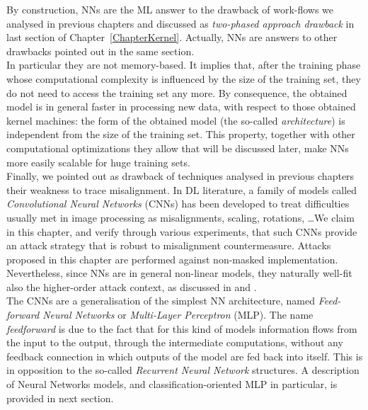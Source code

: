 By construction, NNs are the ML answer to the drawback of work-flows we analysed in previous chapters and discussed as \emph{two-phased approach drawback} in last section of Chapter~\ref{ChapterKernel}. Actually, NNs are answers to other drawbacks pointed out in the same section. \\
In particular they are not memory-based. It implies that, after the training phase whose computational complexity is influenced by the size of the training set, they do not need to access the training set any more. By consequence, the obtained model is in general faster in processing new data, with respect to those obtained \via kernel machines: the form of the obtained model (\ie the so-called \emph{architecture}) is independent from the size of the training set. This property, together with other computational optimizations they allow that will be discussed later, make NNs more easily scalable for huge training sets.\\
Finally, we pointed out as drawback of techniques analysed in previous chapters their weakness to trace misalignment. In DL literature, a family of models called \emph{Convolutional Neural Networks} (CNNs) has been developed to treat difficulties usually met in image processing as misalignments, scaling, rotations, \dots We claim in this chapter, and verify through various experiments, that such CNNs provide an attack strategy that is robust to misalignment countermeasure. Attacks proposed in this chapter are performed against non-masked implementation. Nevertheless, since NNs are in general non-linear models, they naturally well-fit also the higher-order attack context, as discussed in \cite{maghrebi2016breaking} and \cite{DLwhitepaper}.\\
The CNNs are a generalisation of the simplest NN architecture, named \emph{Feed-forward Neural Networks} or \emph{Multi-Layer Perceptron} (MLP). The name \emph{feedforward} is due to the fact that for this kind of models information ﬂows from  the input to the output, through the intermediate computations, without any feedback connection in which outputs of the model are fed back into itself. This is in opposition to the so-called \emph{Recurrent Neural Network} structures. A description of Neural Networks models, and classification-oriented MLP in particular, is provided in next section.


